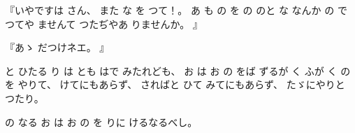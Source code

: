 
%
『いやですは
さん、
%
また
な
を
つて！。
%
あ
も
の
を
の
のと
な
なんか
の
で
つてや
ませんて
つたぢやあ
りませんか。
』

%
『あゝ
だつけネエ。
』

%
と
ひたる
り
は
とも
はで
みたれども、
%
お
は
お
の
をば
ずるが
く
ふが
く
の
を
やりて、
%
けてにもあらず、
%
さればと
ひて
みてにもあらず、
%
たゞにやりと
つたり。

%
の
なる
お
は
お
の
を
りに
けるなるべし。

